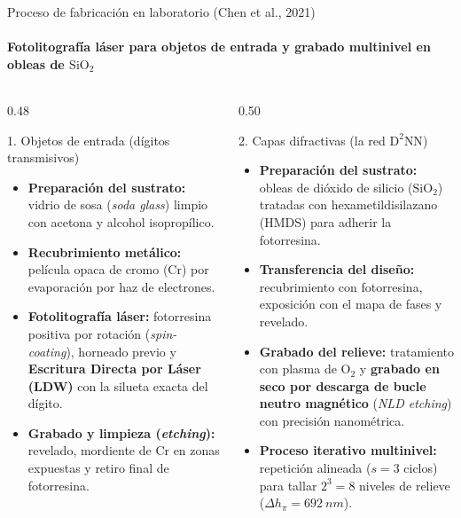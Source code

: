 \documentclass[aspectratio=169,10pt]{beamer}
\begin{document}
\begin{frame}{Proceso de fabricación en laboratorio (Chen et al., 2021)}
\framesubtitle{Fotolitografía láser para objetos de entrada y grabado multinivel en obleas de $\mathrm{SiO_2}$}
\begin{columns}[T,onlytextwidth]
  \begin{column}{0.48\textwidth}
    \begin{azulbox}{1. Objetos de entrada (dígitos transmisivos)}
      \scriptsize
      \begin{itemize}\setlength\itemsep{2.5pt}
        \item \textbf{Preparación del sustrato:} vidrio de sosa (\emph{soda glass}) limpio con acetona y alcohol isopropílico.
        \item \textbf{Recubrimiento metálico:} película opaca de cromo ($\mathrm{Cr}$) por evaporación por haz de electrones.
        \item \textbf{Fotolitografía láser:} fotorresina positiva por rotación (\emph{spin-coating}), horneado previo y \textbf{Escritura Directa por Láser (LDW)} con la silueta exacta del dígito.
        \item \textbf{Grabado y limpieza (\emph{etching}):} revelado, mordiente de $\mathrm{Cr}$ en zonas expuestas y retiro final de fotorresina.
      \end{itemize}
    \end{azulbox}
  \end{column}
  \begin{column}{0.50\textwidth}
    \begin{caja}{2. Capas difractivas (la red $\text{D}^2\text{NN}$)}
      \scriptsize
      \begin{itemize}\setlength\itemsep{2.5pt}
        \item \textbf{Preparación del sustrato:} obleas de dióxido de silicio ($\mathrm{SiO_2}$) tratadas con hexametildisilazano (HMDS) para adherir la fotorresina.
        \item \textbf{Transferencia del diseño:} recubrimiento con fotorresina, exposición con el mapa de fases y revelado.
        \item \textbf{Grabado del relieve:} tratamiento con plasma de $\mathrm{O_2}$ y \textbf{grabado en seco por descarga de bucle neutro magnético} (\emph{NLD etching}) con precisión nanométrica.
        \item \textbf{Proceso iterativo multinivel:} repetición alineada ($s=3$ ciclos) para tallar $2^3=8$ niveles de relieve ($\Delta h_\pi=\SI{692}{nm}$).
      \end{itemize}
    \end{caja}
  \end{column}
\end{columns}
\end{frame}
\end{document}
